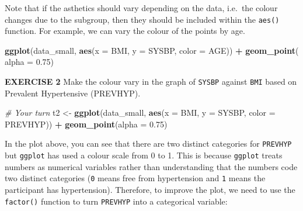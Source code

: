 \documentclass[
]{article}
\newenvironment{Shaded}{\begin{snugshade}}{\end{snugshade}}
\newcommand{\CommentTok}[1]{\textcolor[rgb]{0.56,0.35,0.01}{\textit{#1}}}
\newcommand{\DataTypeTok}[1]{\textcolor[rgb]{0.13,0.29,0.53}{#1}}
\newcommand{\DecValTok}[1]{\textcolor[rgb]{0.00,0.00,0.81}{#1}}
\newcommand{\FloatTok}[1]{\textcolor[rgb]{0.00,0.00,0.81}{#1}}
\newcommand{\KeywordTok}[1]{\textcolor[rgb]{0.13,0.29,0.53}{\textbf{#1}}}
\newcommand{\NormalTok}[1]{#1}
\newcommand{\OperatorTok}[1]{\textcolor[rgb]{0.81,0.36,0.00}{\textbf{#1}}}
\newcommand{\StringTok}[1]{\textcolor[rgb]{0.31,0.60,0.02}{#1}}
\begin{document}
Note that if the asthetics should vary depending on the data, i.e.~the
colour changes due to the subgroup, then they should be included within
the \texttt{aes()} function. For example, we can vary the colour of the
points by age.

\begin{Shaded}
\begin{Highlighting}[]
\KeywordTok{ggplot}\NormalTok{(data_small, }
       \KeywordTok{aes}\NormalTok{(}\DataTypeTok{x =}\NormalTok{ BMI, }\DataTypeTok{y =}\NormalTok{ SYSBP, }\DataTypeTok{color =}\NormalTok{ AGE)) }\OperatorTok{+}\StringTok{ }
\StringTok{  }\KeywordTok{geom_point}\NormalTok{( }\DataTypeTok{alpha =} \FloatTok{0.75}\NormalTok{) }
\end{Highlighting}
\end{Shaded}

\textbf{EXERCISE 2} Make the colour vary in the graph of \texttt{SYSBP}
against \texttt{BMI} based on Prevalent Hypertensive (PREVHYP).

\begin{Shaded}
\begin{Highlighting}[]
\CommentTok{# Your turn}
\NormalTok{t2 <-}\StringTok{ }\KeywordTok{ggplot}\NormalTok{(data_small, }
       \KeywordTok{aes}\NormalTok{(}\DataTypeTok{x =}\NormalTok{ BMI, }\DataTypeTok{y =}\NormalTok{ SYSBP, }\DataTypeTok{color =}\NormalTok{ PREVHYP)) }\OperatorTok{+}
\StringTok{  }\KeywordTok{geom_point}\NormalTok{(}\DataTypeTok{alpha =} \FloatTok{0.75}\NormalTok{)}
\end{Highlighting}
\end{Shaded}

In the plot above, you can see that there are two distinct categories
for \texttt{PREVHYP} but \texttt{ggplot} has used a colour scale from 0
to 1. This is because \texttt{ggplot} treats numbers as numerical
variables rather than understanding that the numbers code two distinct
categories (\texttt{0} means free from hypertension and \texttt{1} means
the participant has hypertension). Therefore, to improve the plot, we
need to use the \texttt{factor()} function to turn \texttt{PREVHYP} into
a categorical variable:

\begin{Shaded}
\end{Shaded}
\end{document}
